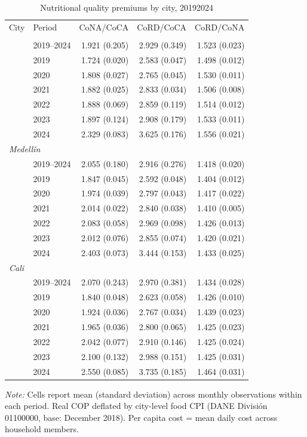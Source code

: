 \begin{table}[htbp]
\centering\small
\caption{Nutritional quality premiums by city, 2019\textendash{}2024}
\label{tab:cost_premiums}
\begin{tabular}{llrrr}
\toprule
City & Period & CoNA/CoCA & CoRD/CoCA & CoRD/CoNA \\
\addlinespace[2pt]
\midrule
\multicolumn{5}{l}{\textit{Bogotá}} \\
 & 2019–2024 & 1.921 (0.205) & 2.929 (0.349) & 1.523 (0.023) \\
 & 2019 & 1.724 (0.020) & 2.583 (0.047) & 1.498 (0.012) \\
 & 2020 & 1.808 (0.027) & 2.765 (0.045) & 1.530 (0.011) \\
 & 2021 & 1.882 (0.025) & 2.833 (0.034) & 1.506 (0.008) \\
 & 2022 & 1.888 (0.069) & 2.859 (0.119) & 1.514 (0.012) \\
 & 2023 & 1.897 (0.124) & 2.908 (0.179) & 1.533 (0.011) \\
 & 2024 & 2.329 (0.083) & 3.625 (0.176) & 1.556 (0.021) \\
\midrule
\multicolumn{5}{l}{\textit{Medellín}} \\
 & 2019–2024 & 2.055 (0.180) & 2.916 (0.276) & 1.418 (0.020) \\
 & 2019 & 1.847 (0.045) & 2.592 (0.048) & 1.404 (0.012) \\
 & 2020 & 1.974 (0.039) & 2.797 (0.043) & 1.417 (0.022) \\
 & 2021 & 2.014 (0.022) & 2.840 (0.038) & 1.410 (0.005) \\
 & 2022 & 2.083 (0.058) & 2.969 (0.098) & 1.426 (0.013) \\
 & 2023 & 2.012 (0.076) & 2.855 (0.074) & 1.420 (0.021) \\
 & 2024 & 2.403 (0.073) & 3.444 (0.153) & 1.433 (0.025) \\
\midrule
\multicolumn{5}{l}{\textit{Cali}} \\
 & 2019–2024 & 2.070 (0.243) & 2.970 (0.381) & 1.434 (0.028) \\
 & 2019 & 1.840 (0.048) & 2.623 (0.058) & 1.426 (0.010) \\
 & 2020 & 1.924 (0.036) & 2.767 (0.034) & 1.439 (0.023) \\
 & 2021 & 1.965 (0.036) & 2.800 (0.065) & 1.425 (0.023) \\
 & 2022 & 2.042 (0.077) & 2.910 (0.146) & 1.425 (0.024) \\
 & 2023 & 2.100 (0.132) & 2.988 (0.151) & 1.425 (0.031) \\
 & 2024 & 2.550 (0.085) & 3.735 (0.185) & 1.464 (0.031) \\
\bottomrule
\end{tabular}
\begin{minipage}{\linewidth}
\vspace{2pt}\footnotesize
\textit{Note:} Cells report mean (standard deviation) across monthly observations within each period. Real COP deflated by city-level food CPI (DANE Divisi\'{o}n 01100000, base: December 2018). Per capita cost = mean daily cost across household members.
\end{minipage}
\end{table}
